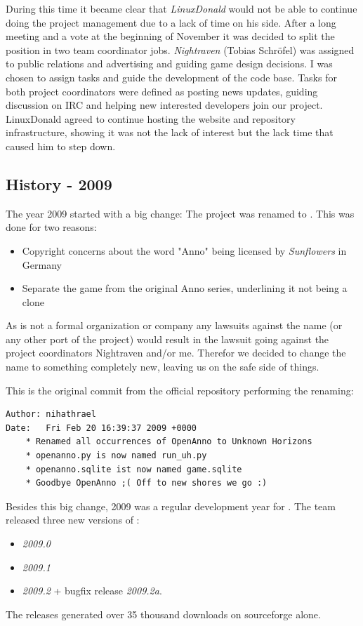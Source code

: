 During this time it became clear that \textit{LinuxDonald} would not be able to continue doing the project management
due to a lack of time on his side. After a long meeting and a vote at the beginning of November it was decided to split the
position in two team coordinator jobs. \textit{Nightraven} (Tobias Schröfel) was assigned to public relations and
advertising and guiding game design decisions. I was chosen to assign tasks and guide the development of the code base.
Tasks for both project coordinators were defined as posting news updates, guiding discussion on IRC and helping new
interested developers join our project. LinuxDonald agreed to continue hosting the website and repository
infrastructure, showing it was not the lack of interest but the lack time that caused him to step down.

\subsection{History - 2009}
The year 2009 started with a big change: The project was renamed to \UH{}. This was done for two reasons:
\begin{itemize}
    \item Copyright concerns about the word "Anno" being licensed by \textit{Sunflowers} in Germany
    \item Separate the game from the original Anno series, underlining it not being a clone
\end{itemize}

As \UH{} is not a formal organization or company any lawsuits against the name (or any other port of the project) would
result in the lawsuit going against the project coordinators Nightraven and/or me. Therefor we decided to change the name to
something completely new, leaving us on the safe side of things.

This is the original commit from the official repository performing the renaming:
\begin{lstlisting}[caption=Commit 1831 renaming OpenAnno to Unknown Horizons, label=renamecommit]
Author: nihathrael
Date:   Fri Feb 20 16:39:37 2009 +0000
    * Renamed all occurrences of OpenAnno to Unknown Horizons
    * openanno.py is now named run_uh.py
    * openanno.sqlite ist now named game.sqlite
    * Goodbye OpenAnno ;( Off to new shores we go :)
\end{lstlisting}

Besides this big change, 2009 was a regular development year for \UH{}. The team released three new versions of \UH{}:
\begin{itemize}
\item \textit{2009.0}
\item \textit{2009.1}
\item \textit{2009.2} + bugfix release \textit{2009.2a}. 
\end{itemize}
The releases generated over 35 thousand downloads on sourceforge alone.

